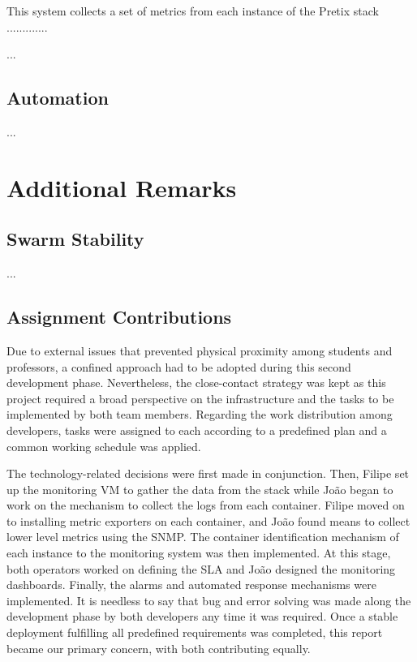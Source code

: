 \documentclass[12pt]{article}
\begin{document}
This system collects a set of metrics from each instance of the Pretix stack .............

...

\subsection{Automation} \label{management.automation} %


...

\newpage
\section{Additional Remarks} \label{remarks} %

\subsection{Swarm Stability} \label{remarks.stability} %


...

\subsection{Assignment Contributions} \label{remarks.contributions} %


Due to external issues that prevented physical proximity among students and professors, a confined approach had to be adopted during this second development phase.
Nevertheless, the close-contact strategy was kept as this project required a broad perspective on the infrastructure and the tasks to be implemented by both team members.
Regarding the work distribution among developers, tasks were assigned to each according to a predefined plan and a common working schedule was applied. 

The technology-related decisions were first made in conjunction.
Then, Filipe set up the monitoring VM to gather the data from the stack while João began to work on the mechanism to collect the logs from each container.
Filipe moved on to installing metric exporters on each container, and João found means to collect lower level metrics using the SNMP.
The container identification mechanism of each instance to the monitoring system was then implemented.
At this stage, both operators worked on defining the SLA and João designed the monitoring dashboards.
Finally, the alarms and automated response mechanisms were implemented.
It is needless to say that bug and error solving was made along the development phase by both developers any time it was required.
Once a stable deployment fulfilling all predefined requirements was completed, this report became our primary concern, with both contributing equally.
\end{document}
